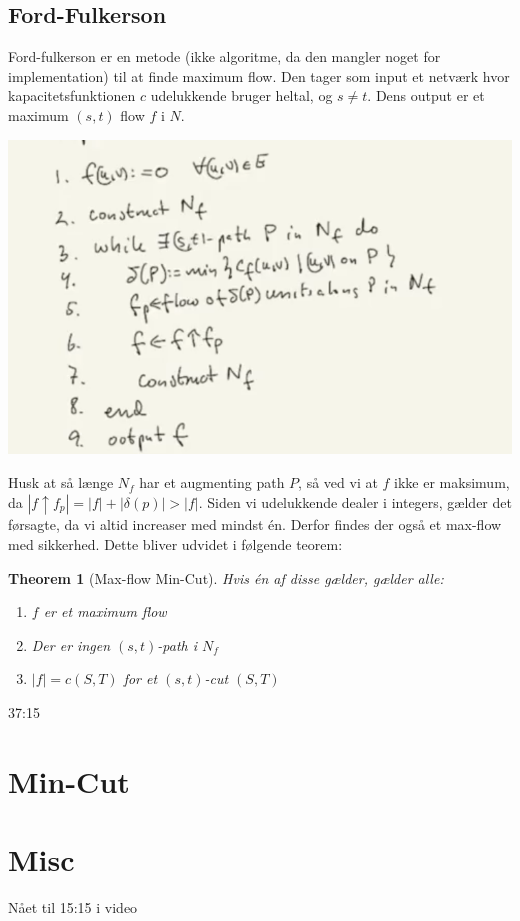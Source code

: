 \documentclass[11pt]{article}
\newtheorem{theorem}{Theorem}
\theoremstyle{definition}
\theoremstyle{remark}
\begin{document}
\subsection{Ford-Fulkerson}
\label{subsec:fordfulkerson}

Ford-fulkerson er en metode (ikke algoritme, da den mangler noget for implementation) til at finde maximum flow. Den tager som input et netværk hvor kapacitetsfunktionen $c$ udelukkende bruger heltal, og $s \neq t$. Dens output er et maximum $(s,t)$ flow $f$ i $N$.

\begin{center}
\includegraphics[scale=0.5]{ff.png}
\end{center}

Husk at så længe $N_{f}$ har et augmenting path $P$, så ved vi at $f$ ikke er maksimum, da $|f \uparrow f_{p}| = |f| + |\delta(p)| > |f|$.
Siden vi udelukkende dealer i integers, gælder det førsagte, da vi altid increaser med mindst én. Derfor findes der også et max-flow med sikkerhed. Dette bliver udvidet i følgende teorem:

\begin{theorem}[Max-flow Min-Cut]
  Hvis én af disse gælder, gælder alle:
  \begin{enumerate}
  \item[(1)]\label{item:1} $f$ er et maximum flow
  \item[(2)]\label{item:2} Der er ingen $(s,t)$-path i $N_{f}$
  \item[(3)]\label{item:3}  $|f| = c(S,T)$ for et $(s,t)$-cut $(S,T)$
  \end{enumerate}
\end{theorem}

37:15




\section{Min-Cut}
\label{sec:mincut}

\section{Misc}
\label{sec:misc}


Nået til 15:15 i video
\end{document}
